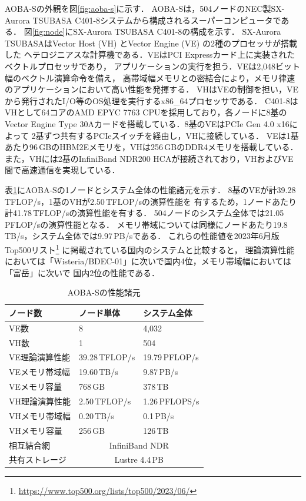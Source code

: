 ﻿\documentclass[submit,techrep,noauthor]{ipsj}
\begin{document}
AOBA-Sの外観を図\ref{fig:aoba-s}に示す．
AOBA-Sは，504ノードのNEC製SX-Aurora TSUBASA C401-8システムから構成されるスーパーコンピュータである．
図\ref{fig:node}にSX-Aurora TSUBASA C401-8の構成を示す．
SX-Aurora TSUBASAはVector Host (VH) とVector Engine (VE) の2種のプロセッサが搭載した
ヘテロジニアスな計算機である．VEはPCI Expressカード上に実装されたベクトルプロセッサであり，
アプリケーションの実行を担う．VEは2,048ビット幅のベクトル演算命令を備え，
高帯域幅メモリとの密結合により，メモリ律速のアプリケーションにおいて高い性能を発揮する．
VHはVEの制御を担い，VEから発行されたI/O等のOS処理を実行するx86\_64プロセッサである．
C401-8はVHとして64コアのAMD EPYC 7763 CPUを採用しており，各ノードに8基のVector Engine Type
30Aカードを搭載している．8基のVEはPCIe Gen 4.0 x16によって
2基ずつ共有するPCIeスイッチを経由し，VHに接続している．
VEは1基あたり96\,GBのHBM2Eメモリを，VHは256\,GBのDDR4メモリを搭載している．また，VHには2基のInfiniBand
NDR200 HCAが接続されており，VHおよびVE間で高速通信を実現している．

表\ref{tbl:aoba-s}にAOBA-Sの1ノードとシステム全体の性能諸元を示す．
8基のVEが計39.28\,TFLOP/s，1基のVHが2.50\,TFLOP/sの演算性能を
有するため，1ノードあたり計41.78\,TFLOP/sの演算性能を有する．
504ノードのシステム全体では21.05\,PFLOP/sの演算性能となる．
メモリ帯域については同様にノードあたり19.8\,TB/s，システム全体では9.97\,PB/sである．
これらの性能値を2023年6月版Top500リスト\footnote{\url{https://www.top500.org/lists/top500/2023/06/}}
に掲載されている国内のシステムと比較すると，
理論演算性能においては「Wisteria/BDEC-01」に次いで国内4位，メモリ帯域幅においては「富岳」に次いで
国内2位の性能である．

\begin{table}[tb]
\centering
\caption{AOBA-Sの性能諸元}\label{tbl:aoba-s}
\begin{tabular}{@{}lll@{}}
\toprule
ノード数        & ノード単体     & システム全体           \\ \midrule
VE数            & 8              & 4,032                  \\ \midrule
VH数            & 1              & 504                    \\
VE理論演算性能  & 39.28\,TFLOP/s & 19.79\,PFLOP/s         \\
VEメモリ帯域幅  & 19.60\,TB/s    & 9.87\,PB/s             \\
VEメモリ容量    & 768\,GB        & 378\,TB                \\ \midrule
VH理論演算性能  & 2.50\,TFLOP/s  & 1.26\,PFLOPS/s         \\
VHメモリ帯域幅  & 0.20\,TB/s     & 0.1\,PB/s              \\
VHメモリ容量    & 256\,GB        & 126\,TB                \\ \midrule
相互結合網      & \multicolumn{2}{c}{InfiniBand NDR}      \\
共有ストレージ  & \multicolumn{2}{c}{Lustre 4.4\,PB}      \\ \bottomrule
\end{tabular}
\end{table}
\end{document}
